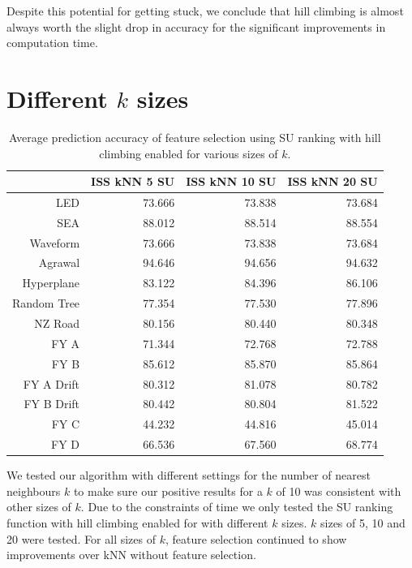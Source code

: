 Despite this potential for getting stuck, we conclude that hill climbing is almost always worth the slight drop in accuracy for the significant improvements in computation time.

\section{Different $k$ sizes}
\begin{table}[h]
\centering
\begin{tabular}{r|rrr}
            & ISS kNN 5 SU & ISS kNN 10 SU & ISS kNN 20 SU \\ \hline
LED         & 73.666   & 73.838    & 73.684    \\
SEA         & 88.012   & 88.514    & 88.554    \\
Waveform    & 73.666   & 73.838    & 73.684    \\
Agrawal     & 94.646   & 94.656    & 94.632    \\
Hyperplane  & 83.122   & 84.396    & 86.106    \\
Random Tree & 77.354   & 77.530    & 77.896    \\
NZ Road     & 80.156   & 80.440    & 80.348    \\
FY A        & 71.344   & 72.768    & 72.788    \\
FY B        & 85.612   & 85.870    & 85.864    \\
FY A Drift  & 80.312   & 81.078    & 80.782    \\
FY B Drift  & 80.442   & 80.804    & 81.522    \\
FY C        & 44.232   & 44.816    & 45.014    \\
FY D        & 66.536   & 67.560    & 68.774
\end{tabular}
\caption{Average prediction accuracy of feature selection using SU ranking with hill climbing enabled for various sizes of $k$.}
\label{Table:K_Table_Accuracy}
\end{table}

We tested our algorithm with different settings for the number of nearest neighbours $k$ to make sure our positive results for a $k$ of 10 was consistent with other sizes of $k$. Due to the constraints of time we only tested the SU ranking function with hill climbing enabled for with different $k$ sizes. $k$ sizes of 5, 10 and 20 were tested. For all sizes of $k$, feature selection continued to show improvements over kNN without feature selection. 

